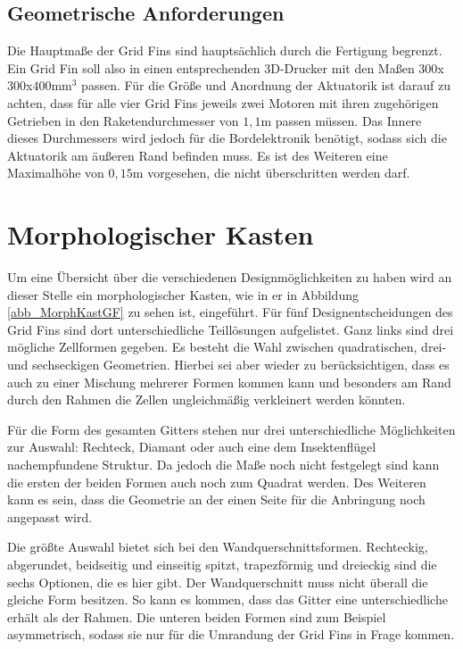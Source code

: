 \subsection{Geometrische Anforderungen}
Die Hauptmaße der Grid Fins sind hauptsächlich durch die Fertigung begrenzt. Ein Grid Fin soll also in einen entsprechenden 3D-Drucker mit den Maßen $300$x$300$x$400\mathrm{mm}^3$ passen. Für die Größe und Anordnung der Aktuatorik ist darauf zu achten, dass für alle vier Grid Fins jeweils zwei Motoren mit ihren zugehörigen Getrieben in den Raketendurchmesser von $1,1$m passen müssen. Das Innere dieses Durchmessers wird jedoch für die Bordelektronik benötigt, sodass sich die Aktuatorik am äußeren Rand befinden muss. Es ist des Weiteren eine Maximalhöhe von $0,15$m vorgesehen, die nicht überschritten werden darf.
\newpage
\section{Morphologischer Kasten}
Um eine Übersicht über die verschiedenen Designmöglichkeiten zu haben wird an dieser Stelle ein morphologischer Kasten, wie in er in Abbildung \ref{abb_MorphKastGF} zu sehen ist, eingeführt. Für fünf Designentscheidungen des Grid Fins sind dort unterschiedliche Teillösungen aufgelistet. Ganz links sind drei mögliche Zellformen gegeben. Es besteht die Wahl zwischen quadratischen, drei- und sechseckigen Geometrien. Hierbei sei aber wieder zu berücksichtigen, dass es auch zu einer Mischung mehrerer Formen kommen kann und besonders am Rand durch den Rahmen die Zellen ungleichmäßig verkleinert werden könnten.

Für die Form des gesamten Gitters stehen nur drei unterschiedliche Möglichkeiten zur Auswahl: Rechteck, Diamant oder auch eine dem Insektenflügel nachempfundene Struktur. Da jedoch die Maße noch nicht festgelegt sind kann die ersten der beiden Formen auch noch zum Quadrat werden. Des Weiteren kann es sein, dass die Geometrie an der einen Seite für die Anbringung noch angepasst wird.

Die größte Auswahl bietet sich bei den Wandquerschnittsformen. Rechteckig, abgerundet, beidseitig und einseitig spitzt, trapezförmig und dreieckig sind die sechs Optionen, die es hier gibt. Der Wandquerschnitt muss nicht überall die gleiche Form besitzen. So kann es kommen, dass das Gitter eine unterschiedliche erhält als der Rahmen. Die unteren beiden Formen sind zum Beispiel asymmetrisch, sodass sie nur für die Umrandung der Grid Fins in Frage kommen.

